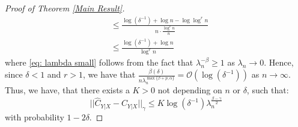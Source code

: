 \documentclass[accepted]{article}
\theoremstyle{definition}
\begin{document}
\begin{proof}[Proof of Theorem \ref{Main Result}]
\begin{align}
    & \leq \frac{\log (\delta^{-1}) + \log n - \log \log^r n}{n \cdot \frac{\log^r n}{n}} \nonumber \\
    & \leq \frac{\log(\delta^{-1}) + \log n}{\log^r n} \nonumber 
\end{align}
where \eqref{eq: lambda small} follows from the fact that $\lambda^{-\beta}_n \geq 1$ as $\lambda_n \to 0$. Hence, since $\delta < 1$ and $r > 1$, we have that $\frac{\beta(\delta)}{n\lambda_n^{\max\{\beta + p, \alpha\}}} = \mathcal{O}(\log(\delta^{-1}))$ as $n \to \infty$. Thus, we have, that there exists a $K > 0$ not depending on $n$ or $\delta$, such that:
\begin{equation*}
    ||\hat{C}_{Y|X} - C_{Y|X}||_{\gamma} \leq K \log (\delta^{-1})\lambda_n^{\frac{\beta - \gamma}{2}}
\end{equation*}
with probability $1 - 2\delta$. 
\end{proof}
\end{document}

